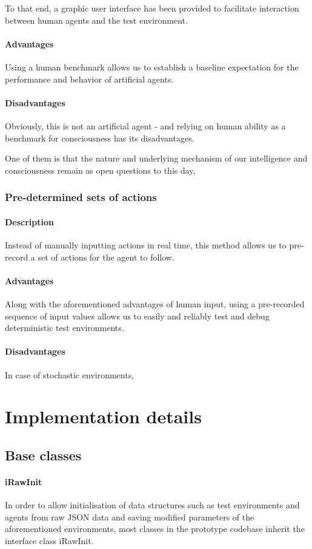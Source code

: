 \documentclass[masterthesis]{fer}
\begin{document}
To that end, a graphic user interface has been provided to facilitate interaction between human agents and the test environment.
\paragraph{Advantages}
Using a human benchmark allows us to establish a baseline expectation for the performance and behavior of artificial agents.
\paragraph{Disadvantages}
Obviously, this is not an artificial agent - and relying on human ability as a benchmark for consciousness has its disadvantages.

One of them is that the nature and underlying mechanism of our intelligence and consciousness remain as open questions to this day,
\subsubsection{Pre-determined sets of actions}

\paragraph{Description}
Instead of manually inputting actions in real time, this method allows us to pre-record a set of actions for the agent to follow.
\paragraph{Advantages}
Along with the aforementioned advantages of human input, using a pre-recorded sequence of input values allows us to easily and reliably test and debug deterministic test environments.
\paragraph{Disadvantages}
In case of stochastic environments, 

\section{Implementation details}
\subsection{Base classes}
\paragraph{iRawInit}
In order to allow initialisation of data structures such as test environments and agents from raw JSON data and saving modified parameters of the aforementioned environments,
most classes in the prototype codebase inherit the interface class iRawInit.
\end{document}
